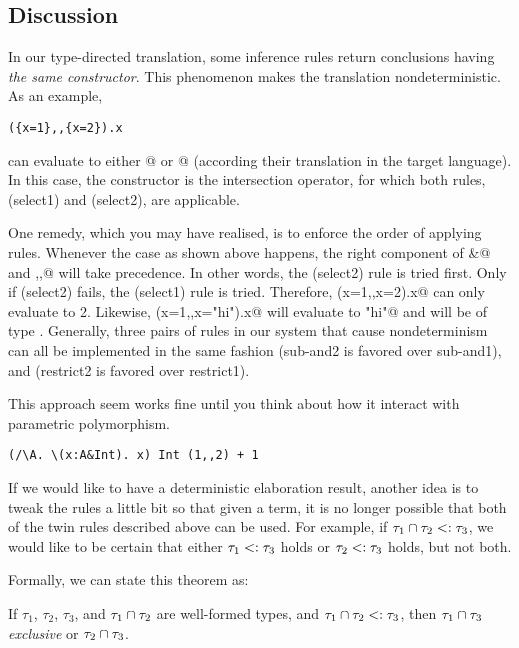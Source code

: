 \documentclass[nocopyrightspace,preprint,times,9pt]{sigplanconf}
\begin{document}
\subsection{Discussion}

In our type-directed translation, some inference rules return conclusions having
\emph{the same constructor}. This phenomenon makes the translation
nondeterministic. As an example,

\begin{lstlisting}
({x=1},,{x=2}).x
\end{lstlisting}

can evaluate to either @ or @ (according their
translation in the target language). In this case, the constructor is the
intersection operator, for which both rules, (select1) and (select2), are
applicable.

One remedy, which you may have realised, is to enforce the order of applying
rules. Whenever the case as shown above happens, the right component of
\lstinline@&@ and \lstinline@,,@ will take precedence. In other words, the
(select2) rule is tried first. Only if (select2) fails, the (select1) rule is
tried. Therefore, \lstinline@({x=1},,{x=2}).x@ can only evaluate to 2. Likewise,
\lstinline@({x=1},,{x="hi"}).x@ will evaluate to \lstinline@"hi"@ and will be of
type \lstinline@String@. Generally, three pairs of rules in our system that
cause nondeterminism can all be implemented in the same fashion (sub-and2 is
favored over sub-and1), and (restrict2 is favored over restrict1).

This approach seem works fine until you think about how it interact with
parametric polymorphism.

\begin{lstlisting}
(/\A. \(x:A&Int). x) Int (1,,2) + 1
\end{lstlisting}

If we would like to have a deterministic elaboration result, another idea is to
tweak the rules a little bit so that given a term, it is no longer possible that
both of the twin rules described above can be used. For example, if
$\tau_1 \cap \tau_2 <:
\tau_3$, we would like to be certain that either $\tau_1 <:
\tau_3$ holds or $\tau_2 <: \tau_3$ holds, but not both.

Formally, we can state this theorem as:

\begin{theorem}
  If $\tau_1$, $\tau_2$, $\tau_3$, and $\tau_1 \cap \tau_2$ are well-formed
  types, and $\tau_1 \cap \tau_2 <: \tau_3$, then $\tau_1 \cap \tau_3$
  \emph{exclusive} or $\tau_2 \cap \tau_3$.
\end{theorem}
\end{document}

